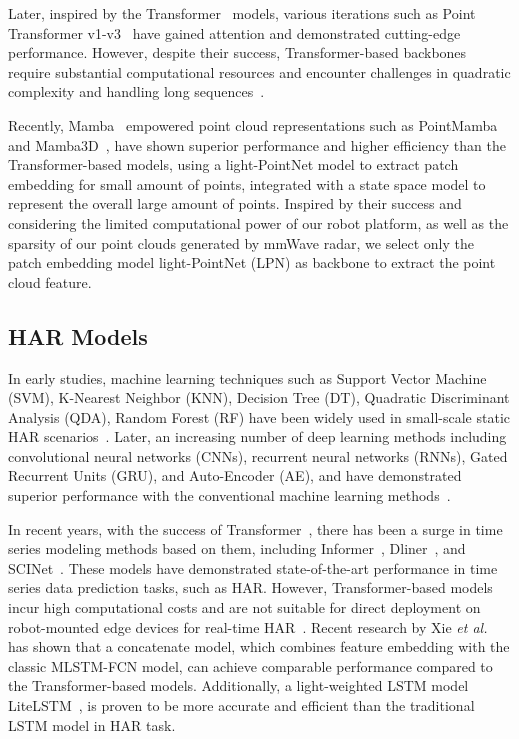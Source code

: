 Later, inspired by the Transformer~\cite{vaswani2017attention} models, various iterations such as Point Transformer v1-v3~\cite{zhao2021point, wu2022point, wu2023point} have gained attention and demonstrated cutting-edge performance. 
However, despite their success, Transformer-based backbones require substantial computational resources and encounter challenges in quadratic complexity and handling long sequences~\cite{han2024mamba3d}.

Recently, Mamba~\cite{gu2023mamba} empowered point cloud representations such as PointMamba~\cite{liu2024point} and Mamba3D~\cite{han2024mamba3d}, have shown superior performance and higher efficiency than the Transformer-based models, using a light-PointNet model to extract patch embedding for small amount of points, integrated with a state space model to represent the overall large amount of points. Inspired by their success and considering the limited computational power of our robot platform, as well as the sparsity of our point clouds generated by mmWave radar, we select only the patch embedding model light-PointNet (LPN) as backbone to extract the point cloud feature.  


\subsection{HAR Models}

In early studies, machine learning techniques such as Support Vector Machine (SVM), K-Nearest Neighbor (KNN), Decision Tree (DT), Quadratic Discriminant Analysis (QDA), Random Forest (RF) have been widely used in small-scale static HAR scenarios~\cite{xu2019lecture2note, li2019survey}. 
Later, an increasing number of deep learning methods including convolutional neural networks (CNNs), recurrent neural networks (RNNs), Gated Recurrent Units (GRU), and Auto-Encoder (AE), and have demonstrated superior performance with the conventional machine learning methods~\cite{xu2022morphtext,xu2024seeing,singh2019radhar}.  

In recent years, with the success of Transformer~\cite{vaswani2017attention}, there has been a surge in time series modeling methods based on them, including Informer~\cite{haoyietal-informer-2021}, Dliner~\cite{zeng2023transformers}, and SCINet~\cite{liu2022SCINet}. 
These models have demonstrated state-of-the-art performance in time series data prediction tasks, such as HAR. 
However, Transformer-based models incur high computational costs and are not suitable for direct deployment on robot-mounted edge devices for real-time HAR~\cite{han2024mamba3d}. 
Recent research by Xie \textit{et al.}~\cite{xie2024tsc} has shown that a concatenate model, which combines feature embedding with the classic MLSTM-FCN model, can achieve comparable performance compared to the Transformer-based models. 
Additionally, a light-weighted LSTM model LiteLSTM~\cite{elsayed2022litelstm}, is proven to be more accurate and efficient than the traditional LSTM model in HAR task.


